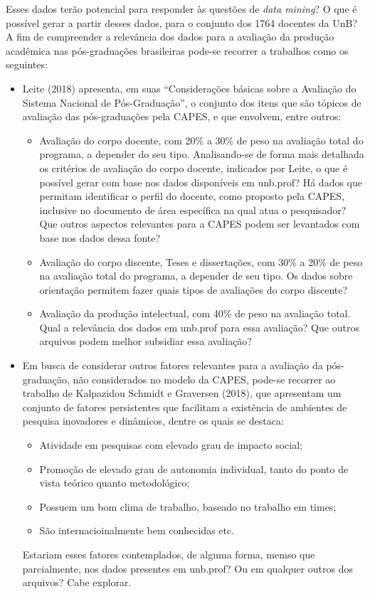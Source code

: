 \documentclass[]{article}
\providecommand{\tightlist}{%
  \setlength{\itemsep}{0pt}\setlength{\parskip}{0pt}}
\begin{document}
Esses dados terão potencial para responder às questões de \emph{data
mining}? O que é possível gerar a partir desses dados, para o conjunto
dos 1764 docentes da UnB? A fim de compreender a relevância dos dados
para a avaliação da produção acadêmica nas pós-graduações brasileiras
pode-se recorrer a trabalhos como os seguintes:

\begin{itemize}
\tightlist
\item
  Leite (2018) apresenta, em suas ``Considerações básicas sobre a
  Avaliação do Sistema Nacional de Pós-Graduação'', o conjunto dos itens
  que são tópicos de avaliação das pós-graduações pela CAPES, e que
  envolvem, entre outros:

  \begin{itemize}
  \tightlist
  \item
    Avaliação do corpo docente, com 20\% a 30\% de peso na avaliação
    total do programa, a depender do seu tipo. Analisando-se de forma
    mais detalhada os critérios de avaliação do corpo docente, indicados
    por Leite, o que é possível gerar com base nos dados disponíveis em
    unb.prof? Há dados que permitam identificar o perfil do docente,
    como proposto pela CAPES, inclusive no documento de área específica
    na qual atua o pesquisador? Que outros aspectos relevantes para a
    CAPES podem ser levantados com base nos dados dessa fonte?
  \item
    Avaliação do corpo discente, Teses e dissertações, com 30\% a 20\%
    de peso na avaliação total do programa, a depender de seu tipo. Os
    dados sobre orientação permitem fazer quais tipos de avaliações do
    corpo discente?
  \item
    Avaliação da produção intelectual, com 40\% de peso na avaliação
    total. Qual a relevância dos dados em unb.prof para essa avaliação?
    Que outros arquivos podem melhor subsidiar essa avaliação?
  \end{itemize}
\item
  Em busca de considerar outros fatores relevantes para a avaliação da
  pós-graduação, não considerados no modelo da CAPES, pode-se recorrer
  ao trabalho de Kalpazidou Schmidt e Graversen (2018), que apresentam
  um conjunto de fatores persistentes que facilitam a existência de
  ambientes de pesquisa inovadores e dinâmicos, dentre os quais se
  destaca:

  \begin{itemize}
  \tightlist
  \item
    Atividade em pesquisas com elevado grau de impacto social;
  \item
    Promoção de elevado grau de autonomia individual, tanto do ponto de
    vista teórico quanto metodológico;
  \item
    Possuem um bom clima de trabalho, baseado no trabalho em times;
  \item
    São internacioinalmente bem conhecidas etc.
  \end{itemize}

  Estariam esses fatores contemplados, de alguma forma, memso que
  parcialmente, nos dados presentes em unb.prof? Ou em qualquer outros
  dos arquivos? Cabe explorar.
\end{itemize}
\end{document}

